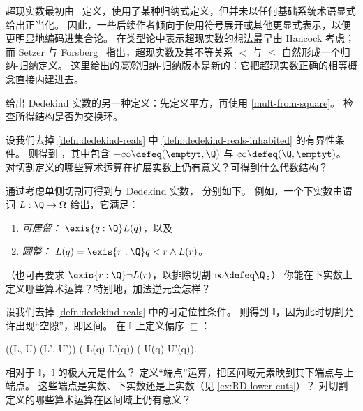 超现实数最初由~\cite{conway:onag} 定义，使用了某种归纳式定义，但并未以任何基础系统术语显式给出正当化。
因此，一些后续作者倾向于使用符号展开或其他更显式表示，以便更明显地编码进集合论。
在类型论中表示超现实数的想法最早由 Hancock 考虑；而
Setzer 与 Forsberg~\cite{forsbergfinite} 指出，超现实数及其不等关系 $<$ 与 $\le$ 自然形成一个归纳-归纳定义。
这里给出的\emph{高阶}归纳-归纳版本是新的：它把超现实数正确的相等概念直接内建进去。


\sectionExercises

\begin{ex}\label{ex:alt-dedekind-reals}
  给出 Dedekind 实数的另一种定义：先定义平方，再使用 \cref{mult-from-square}。
  检查所得结构是否为交换环。
\end{ex}

\begin{ex} \label{ex:RD-extended-reals}
  设我们去掉 \cref{defn:dedekind-reals} 中
  \ref{defn:dedekind-reals-inhabited} 的有界性条件。
  则得到
  ，其中包含 $-\infty \defeq
  (\emptyt, \Q)$ 与 $\infty \defeq (\Q, \emptyt)$。
  对切割定义的哪些算术运算在扩展实数上仍有意义？可得到什么代数结构？
\end{ex}

\begin{ex} \label{ex:RD-lower-cuts}
  通过考虑单侧切割可得到与 Dedekind 实数，
  分别如下。
  例如，一个下实数由谓词 $L : \Q \to \Omega$ 给出，它满足：
  \begin{enumerate}
  \item \emph{可居留：} $\exis{q : \Q} L(q)$，以及
  \item \emph{圆整：} $L(q) = \exis{r : \Q} q < r \land L(r)$。
  \end{enumerate}
  （也可再要求 $\exis{r : \Q} \lnot L(r)$，以排除切割 $\infty \defeq
  \Q$。）
  你能在下实数上定义哪些算术运算？特别地，加法逆元会怎样？
\end{ex}

\begin{ex} \label{ex:RD-interval-arithmetic}
  设我们去掉 \cref{defn:dedekind-reals} 中的可定位性条件。
  则得到
  $\mathbb{I}$，因为此时切割允许出现“空隙”，即区间。
  在 $\mathbb{I}$ 上定义偏序 $\sqsubseteq$：
  \begin{narrowmultline*}
    ((L, U) \sqsubseteq (L', U'))
     \narrowbreak
    ( L(q) \Rightarrow L'(q)) \land
    ( U(q) \Rightarrow U'(q)).
  \end{narrowmultline*}
  相对于 $\mathbb{I}$，$\mathbb{I}$ 的极大元是什么？
  定义“端点”运算，把区间域元素映到其下端点与上端点。
  这些端点是实数、下实数还是上实数（见
  \cref{ex:RD-lower-cuts}）？
  对切割定义的哪些算术运算在区间域上仍有意义？
\end{ex}

